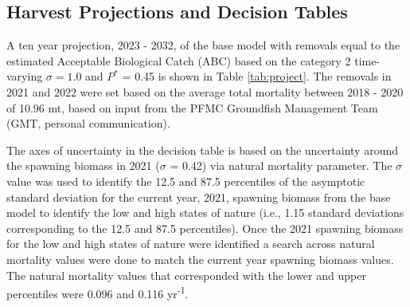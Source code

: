 \documentclass[11pt,
  english,
  a4paper,
]{article}
\begin{document}
\leavevmode\tagmcend\tagstructend\par


\hypertarget{harvest-projections-and-decision-tables}{%
\subsection{Harvest Projections and Decision Tables}\label{harvest-projections-and-decision-tables}}

\leavevmode\tagmcend\tagstructend


A ten year projection, 2023 - 2032, of the base model with removals equal to the estimated Acceptable Biological Catch (ABC) based on the category 2 time-varying {\(\sigma = 1.0\)\leavevmode\tagmcend\tagstructend} and {\(P^*\)\leavevmode\tagmcend\tagstructend} = 0.45 is shown in Table \ref{tab:project}. The removals in 2021 and 2022 were set based on the average total mortality between 2018 - 2020 of 10.96 mt, based on input from the PFMC Groundfish Management Team (GMT, personal communication).

\leavevmode\tagmcend\tagstructend\par


The axes of uncertainty in the decision table is based on the uncertainty around the spawning biomass in 2021 ({\(\sigma\)\leavevmode\tagmcend\tagstructend} = 0.42) via natural mortality parameter. The {\(\sigma\)\leavevmode\tagmcend\tagstructend} value was used to identify the 12.5 and 87.5 percentiles of the asymptotic standard deviation for the current year, 2021, spawning biomass from the base model to identify the low and high states of nature (i.e., 1.15 standard deviations corresponding to the 12.5 and 87.5 percentiles). Once the 2021 spawning biomass for the low and high states of nature were identified a search across natural mortality values were done to match the current year spawning biomass values. The natural mortality values that corresponded with the lower and upper percentiles were 0.096 and 0.116 yr\textsuperscript{-1}.

\leavevmode\tagmcend\tagstructend\par
\end{document}
